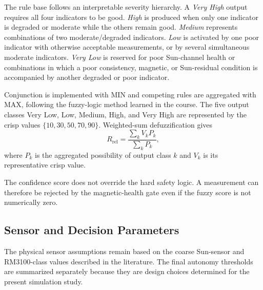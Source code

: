 \documentclass[11pt,a4paper]{article}
\begin{document}
The rule base follows an interpretable severity hierarchy. A \emph{Very High} output requires all four indicators to be good. \emph{High} is produced when only one indicator is degraded or moderate while the others remain good. \emph{Medium} represents combinations of two moderate/degraded indicators. \emph{Low} is activated by one poor indicator with otherwise acceptable measurements, or by several simultaneous moderate indicators. \emph{Very Low} is reserved for poor Sun-channel health or combinations in which a poor consistency, magnetic, or Sun-residual condition is accompanied by another degraded or poor indicator.

Conjunction is implemented with MIN and competing rules are aggregated with MAX, following the fuzzy-logic method learned in the course. The five output classes Very Low, Low, Medium, High, and Very High are represented by the crisp values $\{10,30,50,70,90\}$. Weighted-sum defuzzification gives
\begin{equation}
    R_{\mathrm{rel}}=
    \frac{\sum_k V_kP_k}{\sum_kP_k},
\end{equation}
where $P_k$ is the aggregated possibility of output class $k$ and $V_k$ is its representative crisp value.

The confidence score does not override the hard safety logic. A measurement can therefore be rejected by the magnetic-health gate even if the fuzzy score is not numerically zero.

\subsection{Sensor and Decision Parameters}

The physical sensor assumptions remain based on the coarse Sun-sensor and RM3100-class values described in the literature. The final autonomy thresholds are summarized separately because they are design choices determined for the present simulation study.
\end{document}
